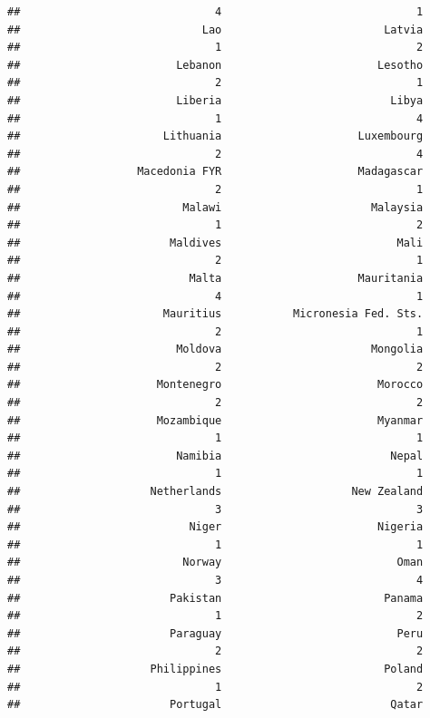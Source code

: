 \documentclass[
]{article}
\begin{document}
\begin{verbatim}
##                              4                              1 
##                            Lao                         Latvia 
##                              1                              2 
##                        Lebanon                        Lesotho 
##                              2                              1 
##                        Liberia                          Libya 
##                              1                              4 
##                      Lithuania                     Luxembourg 
##                              2                              4 
##                  Macedonia FYR                     Madagascar 
##                              2                              1 
##                         Malawi                       Malaysia 
##                              1                              2 
##                       Maldives                           Mali 
##                              2                              1 
##                          Malta                     Mauritania 
##                              4                              1 
##                      Mauritius           Micronesia Fed. Sts. 
##                              2                              1 
##                        Moldova                       Mongolia 
##                              2                              2 
##                     Montenegro                        Morocco 
##                              2                              2 
##                     Mozambique                        Myanmar 
##                              1                              1 
##                        Namibia                          Nepal 
##                              1                              1 
##                    Netherlands                    New Zealand 
##                              3                              3 
##                          Niger                        Nigeria 
##                              1                              1 
##                         Norway                           Oman 
##                              3                              4 
##                       Pakistan                         Panama 
##                              1                              2 
##                       Paraguay                           Peru 
##                              2                              2 
##                    Philippines                         Poland 
##                              1                              2 
##                       Portugal                          Qatar 

\end{verbatim}
\end{document}
